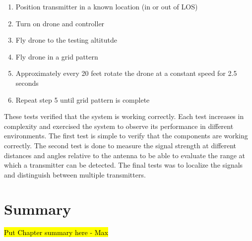 \begin{enumerate}
   \item Position transmitter in a known location (in or out of LOS)
   \item Turn on drone and controller
   \item Fly drone to the testing altitutde
   \item Fly drone in a grid pattern
   \item Approximately every 20 feet rotate the drone at a constant speed for 2.5 seconds
   \item Repeat step 5 until grid pattern is complete
\end{enumerate}
These tests verified that the system is working correctly. Each test increases in complexity and exercised the system to observe its performance in different environments. The first test is simple to verify that the components are working correctly. The second test is done to measure the signal strength at different distances and angles relative to the antenna to be able to evaluate the range at which a transmitter can be detected. The final tests was to localize the signals and distinguish between multiple transmitters.

\section{Summary}
\hl{Put Chapter summary here - Max}
